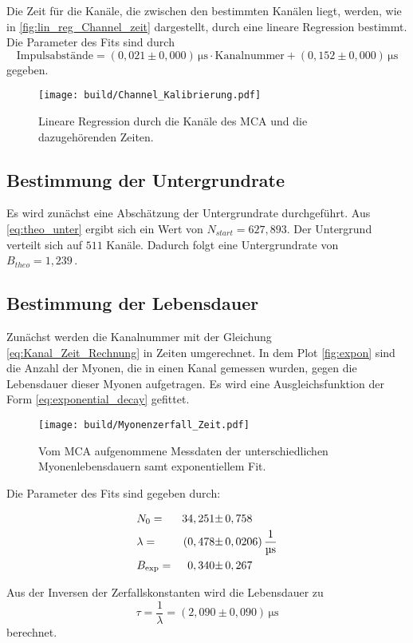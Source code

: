 Die Zeit für die Kanäle, die zwischen den bestimmten Kanälen liegt, werden, wie in \autoref{fig:lin_reg_Channel_zeit} dargestellt, durch eine lineare Regression bestimmt.
Die Parameter des Fits sind durch 
\begin{equation}
    \text{Impulsabstände} = \left(0,021 \pm 0,000 \right) \,\unit{\micro\second} \cdot  \text{Kanalnummer} + \left(0,152 \pm 0,000 \right) \,\unit{\micro\second}
    \label{eq:Kanal_Zeit_Rechnung}
\end{equation}
gegeben.

\begin{figure}[H]
    \centering
    \texttt{[image: build/Channel\_Kalibrierung.pdf]}
    \caption{Lineare Regression durch die Kanäle des MCA und die dazugehörenden Zeiten.}
    \label{fig:lin_reg_Channel_zeit}
\end{figure}

\subsection{Bestimmung der Untergrundrate}
\label{sec:Bes_Unt}
Es wird zunächst eine Abschätzung der Untergrundrate durchgeführt. Aus \eqref{eq:theo_unter} ergibt sich ein Wert von $N_{start} = 627,893$.
Der Untergrund verteilt sich auf $511$ Kanäle. Dadurch folgt eine Untergrundrate von $B_{theo} = 1,239 \, $.


\subsection{Bestimmung der Lebensdauer}
\label{sec:Bes_Leb}

Zunächst werden die Kanalnummer mit der Gleichung \eqref{eq:Kanal_Zeit_Rechnung} in Zeiten umgerechnet.
In dem Plot \autoref{fig:expon} sind die Anzahl der Myonen, die in einen Kanal gemessen wurden, gegen die Lebensdauer dieser Myonen aufgetragen.
Es wird eine Ausgleichsfunktion der Form \eqref{eq:exponential_decay} gefittet.

\begin{figure}[H]
    \centering
    \texttt{[image: build/Myonenzerfall\_Zeit.pdf]}
    \caption{Vom MCA aufgenommene Messdaten der unterschiedlichen Myonenlebensdauern samt exponentiellem Fit.}
    \label{fig:expon}
\end{figure}

Die Parameter des Fits sind gegeben durch:

\begin{align*}
    &N_0                      =& 34,251 \pm& \, 0,758                                 \\
    &\lambda            	  =& (0,478 \pm& \, 0,0206)  \, \unit{\dfrac{1}{\micro\second}} \\
    &B_{\text{exp}}           =& 0,340  \pm& \, 0,267
\end{align*}

Aus der Inversen der Zerfallskonstanten wird die Lebensdauer zu 
\begin{equation*}
    \tau = \dfrac{1}{\lambda} = \left(2,090  \pm 0,090 \right) \,\unit{\micro\second}
\end{equation*}
berechnet.
